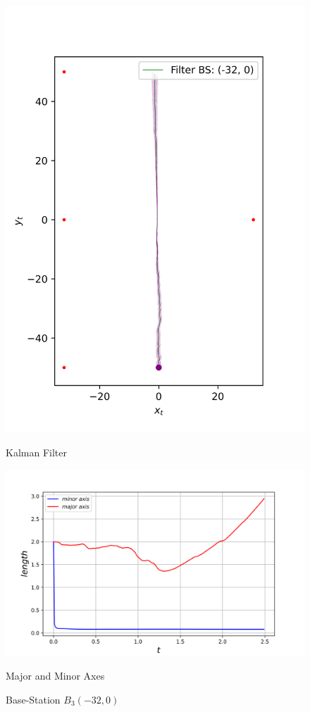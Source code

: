 \begin{figure}[H]
\begin{minipage}{0.49\linewidth}
        \includegraphics[width=\linewidth]{plots/part2-f-2-filter.png}
        \caption*{Kalman Filter}
    \end{minipage}
    \vspace{-0.1cm}
    \begin{minipage}{\linewidth}
        \centering
        \includegraphics[width=\linewidth]{plots/part2-f-2-axes.png}
        \caption*{Major and Minor Axes}
    \end{minipage}
    \caption{Base-Station $B_3(-32, 0)$}
    \label{fig:part2fB3-uncertainty_ellipse}
\end{figure}


